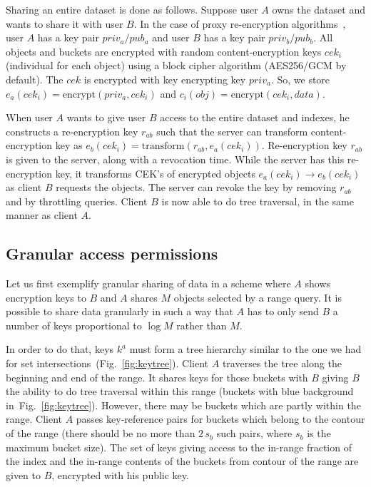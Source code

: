 \documentclass[notitlepage]{revtex4-1}
\newcommand{\figref}[1]{Fig.~\ref{#1}}
\begin{document}
Sharing an entire dataset is done as follows.
Suppose user $A$ owns the dataset and wants to share it with user $B$.
In the case of proxy re-encryption algorithms~\cite{afgh,libert2011unidirectional}, user $A$ has a key pair $priv_a/pub_a$ and user $B$ has a key pair $priv_b/pub_b$.
All objects and buckets are encrypted with random content-encryption keys $cek_i$ (individual for each object) using a block cipher algorithm (AES256/GCM by default).
The $cek$ is encrypted with key encrypting key $priv_a$.
So, we store $e_a(cek_i) = \mbox{encrypt}(priv_a, cek_i)$ and $c_i(obj) = \mbox{encrypt}(cek_i, data)$.

When user $A$ wants to give user $B$ access to the entire dataset and indexes, he constructs a re-encryption key $r_{ab}$ such that
the server can transform content-encryption key as $e_b(cek_i) = \mbox{transform}(r_{ab}, e_a(cek_i))$.
Re-encryption key $r_{ab}$ is given to the server, along with a revocation time.
While the server has this re-encryption key, it transforms CEK's of encrypted objects $e_a(cek_i) \rightarrow e_b(cek_i)$ as client $B$ requests the objects.
The server can revoke the key by removing $r_{ab}$ and by throttling queries.
Client $B$ is now able to do tree traversal, in the same manner as client $A$.

\subsection{Granular access permissions}

Let us first exemplify granular sharing of data in a scheme where $A$ shows encryption keys to $B$ and $A$ shares $M$ objects selected by a range query.
It is possible to share data granularly in such a way that $A$ has to only send $B$ a number of keys proportional to $\log{M}$ rather than $M$.

In order to do that, keys $k^a$ must form a tree hierarchy similar to the one we had for set intersections~(\figref{fig:keytree}).
Client $A$ traverses the tree along the beginning and end of the range.
It shares keys for those buckets with $B$ giving $B$ the ability to do tree traversal within this range (buckets with blue background in~\figref{fig:keytree}).
However, there may be buckets which are partly within the range.
Client $A$ passes key-reference pairs for buckets which belong to the contour of the range (there should be no more than $2\,s_b$ such pairs, where $s_b$ is the maximum bucket size).
The set of keys giving access to the in-range fraction of the index and the in-range contents of the buckets from contour of the range are given to $B$, encrypted with his public key.
\end{document}
